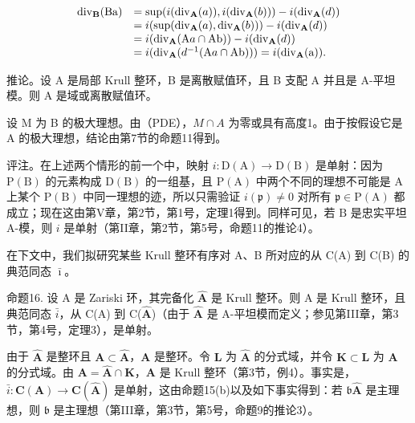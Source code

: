 \[
\begin{array}{r l} \operatorname{div} _ {\mathbf {B}} (\mathrm{Ba}) & = \sup (i (\operatorname{div} _ {\mathbf {A}} (a)), i (\operatorname{div} _ {\mathbf {A}} (b))) - i (\operatorname{div} _ {\mathbf {A}} (d)) \\ & = i (\sup (\operatorname{div} _ {\mathbf {A}} (a), \operatorname{div} _ {\mathbf {A}} (b))) - i (\operatorname{div} _ {\mathbf {A}} (d)) \\ & = i (\operatorname{div} _ {\mathbf {A}} (\mathrm{A} a \cap \mathrm{Ab})) - i (\operatorname{div} _ {\mathbf {A}} (d)) \\ & = i (\operatorname{div} _ {\mathbf {A}} (d ^ {- 1} (\mathrm{A} a \cap \mathrm{Ab}))) = i (\operatorname{div} _ {\mathbf {A}} (\mathrm{a})). \end{array}
\]

推论。设 A 是局部 Krull 整环，B 是离散赋值环，且 B 支配 A 并且是 A-平坦模。则 A 是域或离散赋值环。

设 M 为 B 的极大理想。由（PDE），\(M \cap A\) 为零或具有高度1。由于按假设它是 A 的极大理想，结论由第7节的命题11得到。

评注。在上述两个情形的前一个中，映射 \(i\colon\mathrm{D}(\mathrm{A})\to\mathrm{D}(\mathrm{B})\) 是单射：因为 \(\mathrm{P}(\mathrm{B})\) 的元素构成 \(\mathrm{D}(\mathrm{B})\) 的一组基，且 \(\mathrm{P}(\mathrm{A})\) 中两个不同的理想不可能是 \(\mathrm{A}\) 上某个 \(\mathrm{P}(\mathrm{B})\) 中同一理想的迹，所以只需验证 \(i(\mathfrak{p})\neq0\) 对所有 \(\mathfrak{p}\in\mathrm{P}(\mathrm{A})\) 都成立；现在这由第V章，第2节，第1号，定理1得到。同样可见，若 \(\mathrm{B}\) 是忠实平坦 A-模，则 \(i\) 是单射（第II章，第2节，第5号，命题11的推论4）。

在下文中，我们拟研究某些 Krull 整环有序对 A、B 所对应的从 C(A) 到 C(B) 的典范同态 \(\bar{\imath}\)。

命题16. 设 A 是 Zariski 环，其完备化 \(\hat{\mathbf{A}}\) 是 Krull 整环。则 A 是 Krull 整环，且典范同态 \(\bar{i}\)，从 C(A) 到 C(\(\hat{\mathbf{A}}\))（由于 \(\hat{\mathbf{A}}\) 是 A-平坦模而定义；参见第III章，第3节，第4号，定理3），是单射。

由于 \(\hat{\mathbf{A}}\) 是整环且 \(\mathbf{A} \subset \hat{\mathbf{A}}\)，\(\mathbf{A}\) 是整环。令 \(\mathbf{L}\) 为 \(\hat{\mathbf{A}}\) 的分式域，并令 \(\mathbf{K} \subset \mathbf{L}\) 为 \(\mathbf{A}\) 的分式域。由 \(\mathbf{A} = \hat{\mathbf{A}} \cap \mathbf{K}\)，\(\mathbf{A}\) 是 Krull 整环（第3节，例4）。事实是，\(\bar{i}: \mathbf{C}(\mathbf{A}) \to \mathbf{C}(\hat{\mathbf{A}})\) 是单射，这由命题15(b)以及如下事实得到：若 \(\mathfrak{b}\hat{\mathbf{A}}\) 是主理想，则 \(\mathfrak{b}\) 是主理想（第III章，第3节，第5号，命题9的推论3）。

